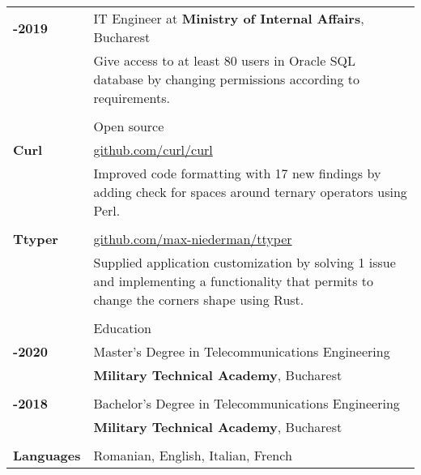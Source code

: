 \documentclass[a4paper,12pt]{article}
\begin{document}
\begin{tabular}{>{\raggedleft\bfseries\arraybackslash}p{3cm}|>{\raggedright\arraybackslash}p{16cm}}
  2018-2019 & IT Engineer at \textbf{Ministry of Internal Affairs}, Bucharest\\
  &\footnotesize{Give access to at least 80 users in Oracle SQL database by changing permissions according to requirements.}\\
  \\
  & Open source \\
    Curl & \href{https://github.com/curl/curl}{github.com/curl/curl}\\
    &\footnotesize{Improved code formatting with 17 new findings by adding check for spaces around ternary operators using Perl.}\\
    \\
    Ttyper &  \href{https://github.com/max-niederman/ttyper}{github.com/max-niederman/ttyper}\\
    &\footnotesize{Supplied application customization by solving 1 issue and implementing a functionality that permits to change the corners shape using Rust.}\\
    \\
    & Education\\
  2018-2020 & Master's Degree in Telecommunications Engineering \\
  & \textbf{Military Technical Academy}, Bucharest \\
  \\
  2014-2018 & Bachelor's Degree in Telecommunications Engineering \\
  & \textbf{Military Technical Academy}, Bucharest\\
  \\
    Languages & Romanian, English, Italian, French
\end{tabular}
\end{document}
